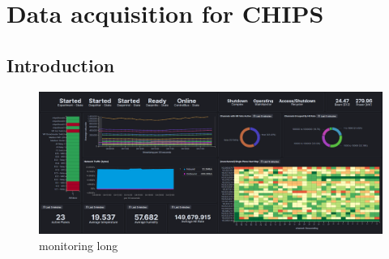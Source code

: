 \chapter{Data acquisition for CHIPS}
\label{chap:daq}

\section{Introduction}
\label{sec:daq_intro}

\begin{figure} %
    \includegraphics[width=\textwidth]{diagrams/6-daq/monitoring.png}
    \caption[monitoring short]
    {monitoring long}
    \label{fig:monitoring}
\end{figure} %

